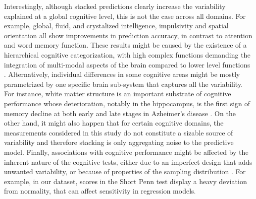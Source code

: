 \documentclass[10pt,letterpaper]{article}
\begin{document}
Interestingly, although stacked predictions clearly increase the variability explained at a global cognitive level, this is not the case across all domains. For example, global, fluid, and crystalized intelligence, impulsivity and spatial orientation all show improvements in prediction accuracy, in contrast to attention and word memory function. These results might be caused by the existence of a hierarchical cognitive categorization, with high complex functions demanding the integration of multi-modal aspects of the brain compared to lower level functions \cite{Taylor2015}. Alternatively, individual differences in some cognitive areas might be mostly parametrized by one specific brain sub-system that captures all the variability. For instance, white matter structure is an important substrate of cognitive performance whose deterioration, notably in the hippocampus, is the first sign of memory decline at both early and late stages in Azheimer's disease \cite{10.3389/fnagi.2017.00215, DENHEIJER20121782}. On the other hand, it might also happen that for certain cognitive domains, the measurements considered in this study do not constitute a sizable source of variability and therefore stacking is only aggregating noise to the predictive model. Finally, associations with cognitive performance might be affected by the inherent nature of the cognitive tests, either due to an imperfect design that adds unwanted variability, or because of  properties  of the sampling distribution .  For example, in our dataset, scores in the Short Penn test display a heavy deviation from normality, that can affect sensitivity in regression models. 
\end{document}
